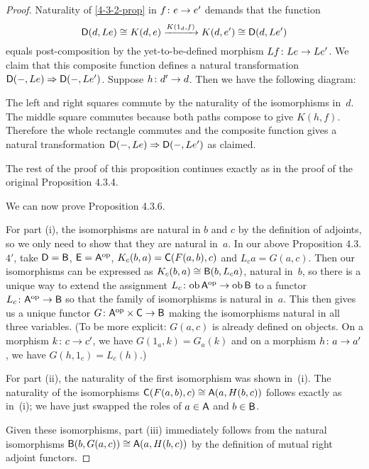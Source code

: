 \documentclass[../../solutions]{subfiles}
\begin{document}
\begin{proof}
  Naturality of \eqref{4-3-2-prop} in ${f}\colon{e}\to{e'}$ demands that
  the function
  $${\mathsf{D}}(d,Le)\cong K(d,e) \xrightarrow{K(1_d,f)} K(d,e') \cong
  {\mathsf{D}}(d,Le')$$
  equals post-composition by the yet-to-be-defined morphism
  ${Lf}\colon{Le}\to{Le'}$.  We claim that this composite function defines
  a natural transformation ${\mathsf{D}}(-,Le)\Rightarrow {\mathsf{D}}(-,Le')$.  Suppose
  ${h}\colon{d'}\to{d}$.  Then we have the following diagram:
  \begin{center}
  \end{center}
  The left and right squares commute by the naturality of the
  isomorphisms in~$d$.  The middle square commutes because both paths
  compose to give $K(h,f)$.  Therefore the whole rectangle commutes
  and the composite function gives a natural transformation
  ${\mathsf{D}}(-,Le)\Rightarrow {\mathsf{D}}(-,Le')$ as claimed.

  The rest of the proof of this proposition continues exactly as in
  the proof of the original Proposition 4.3.4.

  We can now prove Proposition 4.3.6.

  For part (i), the isomorphisms are natural in $b$ and $c$ by the
  definition of adjoints, so we only need to show that they are
  natural in~$a$.  In our above Proposition 4.3.$4'$, take ${\mathsf{D}}={\mathsf{B}}$,
  ${\mathsf{E}}={\mathsf{A}}^{\mathrm{op}}$, $K_c(b,a)={\mathsf{C}}(F(a,b),c)$ and $L_ca=G(a,c)$.  Then our
  isomorphisms can be expressed as $K_c(b,a)\cong {\mathsf{B}}(b,L_ca)$,
  natural in~$b$, so there is a unique way to extend the assignment
  ${L_c}\colon{\operatorname{ob}{\mathsf{A}}^{\mathrm{op}}}\to{\operatorname{ob}{\mathsf{B}}}$ to a functor
  ${L_c}\colon{{\mathsf{A}}^{\mathrm{op}}}\to{{\mathsf{B}}}$ so that the family of isomorphisms is
  natural in~$a$.  This then gives us a unique functor
  ${G}\colon{{\mathsf{A}}^{\mathrm{op}}\times{\mathsf{C}}}\to{{\mathsf{B}}}$ making the isomorphisms natural in
  all three variables.  (To be more explicit: $G(a,c)$ is already
  defined on objects.  On a morphism ${k}\colon{c}\to{c'}$, we have
  $G(1_a,k)=G_a(k)$ and on a morphism ${h}\colon{a}\to{a'}$, we have
  $G(h,1_c)=L_c(h)$.)

  For part (ii), the naturality of the first isomorphism was shown
  in~(i).  The naturality of the isomorphisms
  ${\mathsf{C}}(F(a,b),c)\cong {\mathsf{A}}(a,H(b,c))$ follows exactly as in~(i); we
  have just swapped the roles of $a\in{\mathsf{A}}$ and $b\in{\mathsf{B}}$.

  Given these isomorphisms, part (iii) immediately follows from the
  natural isomorphisms ${\mathsf{B}}(b,G(a,c)) \cong {\mathsf{A}}(a,H(b,c))$ by the
  definition of mutual right adjoint functors.
\end{proof}
\end{document}
